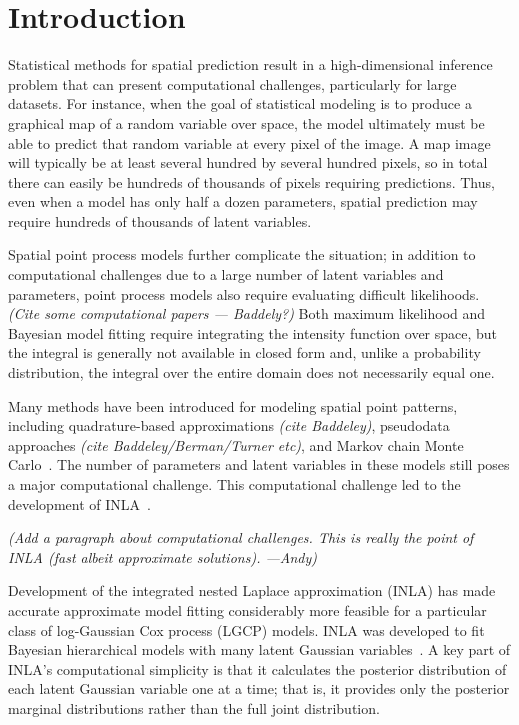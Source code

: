 \documentclass[]{interact}
\begin{document}
\section{Introduction}
\label{intro}


Statistical methods for spatial prediction result in a high-dimensional
inference problem that can present computational challenges, particularly for
large datasets. For instance, when the goal of statistical modeling is to
produce a graphical map of a random variable over space, the model ultimately
must be able to predict that random variable at every pixel of the image. A map
image will typically be at least several hundred by several hundred pixels, so
in total there can easily be hundreds of thousands of pixels requiring
predictions. Thus, even when a model has only half a dozen parameters, spatial
prediction may require hundreds of thousands of latent variables.

Spatial point process models further complicate the situation; in addition to
computational challenges due to a large number of latent variables and
parameters, point process models also require evaluating difficult likelihoods.
{\it (Cite some computational papers --- Baddely?)} Both maximum
likelihood and Bayesian model fitting require integrating the intensity
function over space, but the integral is generally not available in closed
form and, unlike a probability distribution, the integral over the entire
domain does not necessarily equal one.

Many methods have been introduced for modeling spatial point patterns,
including quadrature-based approximations {\it (cite Baddeley)}, pseudodata
approaches {\it (cite Baddeley/Berman/Turner etc)}, and Markov chain Monte
Carlo~\cite{moellerwaagepetersen}. The number of parameters and latent
variables in these models still poses a major computational challenge. This
computational challenge led to the development of INLA~\cite{rueetal}.

{\it (Add a paragraph about computational challenges. This is really the point
of INLA (fast albeit approximate solutions). ---Andy)}

Development of the integrated nested Laplace approximation (INLA) has made
accurate approximate model fitting considerably more feasible for a particular
class of log-Gaussian Cox process (LGCP) models. INLA was developed to fit
Bayesian hierarchical models with many latent Gaussian
variables~\cite{rueetal}. A key part of INLA's computational simplicity is that
it calculates the posterior distribution of each latent Gaussian variable one
at a time; that is, it provides only the posterior marginal distributions
rather than the full joint distribution.
\end{document}

